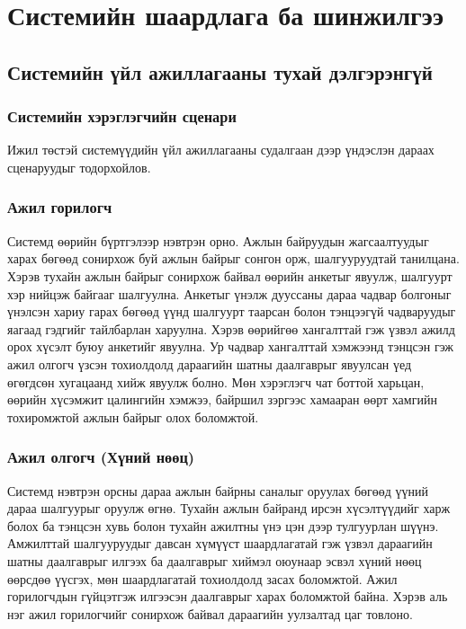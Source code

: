 
\chapter{Системийн шаардлага ба шинжилгээ} %
\label{Chapter2} %

\section{Системийн үйл ажиллагааны тухай дэлгэрэнгүй}
\subsection*{Системийн хэрэглэгчийн сценари}
\par{}Ижил төстэй системүүдийн үйл ажиллагааны судалгаан дээр үндэслэн дараах сценаруудыг тодорхойлов.
\subsection*{Ажил горилогч}
\par{} Системд өөрийн бүртгэлээр нэвтрэн орно. Ажлын байруудын жагсаалтуудыг харах бөгөөд сонирхож буй ажлын байрыг сонгон орж, шалгууруудтай танилцана. Хэрэв тухайн ажлын байрыг сонирхож байвал өөрийн анкетыг явуулж, шалгуурт хэр нийцэж байгааг шалгуулна. Анкетыг үнэлж дууссаны дараа чадвар болгоныг үнэлсэн хариу гарах бөгөөд үүнд шалгуурт таарсан болон тэнцээгүй чадваруудыг яагаад гэдгийг тайлбарлан харуулна. Хэрэв өөрийгөө хангалттай гэж үзвэл ажилд орох хүсэлт буюу анкетийг явуулна. Ур чадвар хангалттай хэмжээнд тэнцсэн гэж ажил олгогч үзсэн тохиолдолд дараагийн шатны даалгаврыг явуулсан үед өгөгдсөн хугацаанд хийж явуулж болно. Мөн хэрэглэгч чат боттой харьцан, өөрийн хүсэмжит цалингийн хэмжээ, байршил зэргээс хамааран өөрт хамгийн тохиромжтой ажлын байрыг олох боломжтой. 
\subsection*{Ажил олгогч (Хүний нөөц)} 
\par{} Системд нэвтрэн орсны дараа ажлын байрны саналыг оруулах бөгөөд үүний дараа шалгуурыг оруулж өгнө. Тухайн ажлын байранд ирсэн хүсэлтүүдийг харж болох ба тэнцсэн хувь болон тухайн ажилтны үнэ цэн дээр тулгуурлан шүүнэ. Амжилттай шалгууруудыг давсан хүмүүст шаардлагатай гэж үзвэл дараагийн шатны даалгаврыг илгээх ба даалгаврыг хиймэл оюунаар эсвэл хүний нөөц өөрсдөө үүсгэх, мөн шаардлагатай тохиолдолд засах боломжтой. Ажил горилогчдын гүйцэтгэж илгээсэн даалгаврыг харах боломжтой байна. Хэрэв аль нэг ажил горилогчийг сонирхож байвал дараагийн уулзалтад цаг товлоно. 
